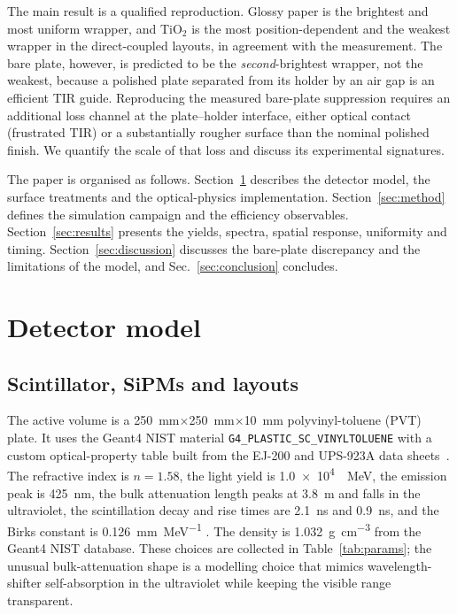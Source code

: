 \documentclass[preprint,12pt]{elsarticle}
\newcommand{\gfour}{Geant4}
\begin{document}
The main result is a qualified reproduction. Glossy paper is the brightest and
most uniform wrapper, and TiO$_2$ is the most position-dependent and the weakest
wrapper in the direct-coupled layouts, in agreement with the measurement. The
bare plate, however, is predicted to be the \emph{second}-brightest wrapper, not
the weakest, because a polished plate separated from its holder by an air gap is
an efficient TIR guide. Reproducing the measured bare-plate suppression requires
an additional loss channel at the plate--holder interface, either optical contact
(frustrated TIR) or a substantially rougher surface than the nominal polished
finish. We quantify the scale of that loss and discuss its experimental
signatures.

The paper is organised as follows. Section~\ref{sec:model} describes the
detector model, the surface treatments and the optical-physics implementation.
Section~\ref{sec:method} defines the simulation campaign and the efficiency
observables. Section~\ref{sec:results} presents the yields, spectra, spatial
response, uniformity and timing. Section~\ref{sec:discussion} discusses the
bare-plate discrepancy and the limitations of the model, and
Sec.~\ref{sec:conclusion} concludes.

\section{Detector model}
\label{sec:model}

\subsection{Scintillator, SiPMs and layouts}

The active volume is a \SI{250}{\milli\meter}$\times$\SI{250}{\milli\meter}$\times$\SI{10}{\milli\meter}
polyvinyl-toluene (PVT) plate. It uses the \gfour{} NIST material
\texttt{G4\_PLASTIC\_SC\_VINYLTOLUENE} with a custom optical-property table
built from the EJ-200 and UPS-923A data
sheets~\cite{EljenEJ200,Artikov2005,AmcrysPS}. The refractive index is
$n=1.58$, the light yield is \SI{1.0e4}{\per\mega\electronvolt}, the emission
peak is \SI{425}{\nano\meter}, the bulk attenuation length peaks at
\SI{3.8}{\meter} and falls in the ultraviolet, the scintillation decay and rise
times are \SI{2.1}{\nano\second} and \SI{0.9}{\nano\second}, and the Birks
constant is \SI{0.126}{\milli\meter\per\mega\electronvolt}
\cite{Birks1951,Craun1970}. The density is \SI{1.032}{\gram\per\cubic\centi\meter}
from the \gfour{} NIST database. These choices are collected in
Table~\ref{tab:params}; the unusual bulk-attenuation shape is a modelling choice
that mimics wavelength-shifter self-absorption in the ultraviolet while keeping
the visible range transparent.
\end{document}
